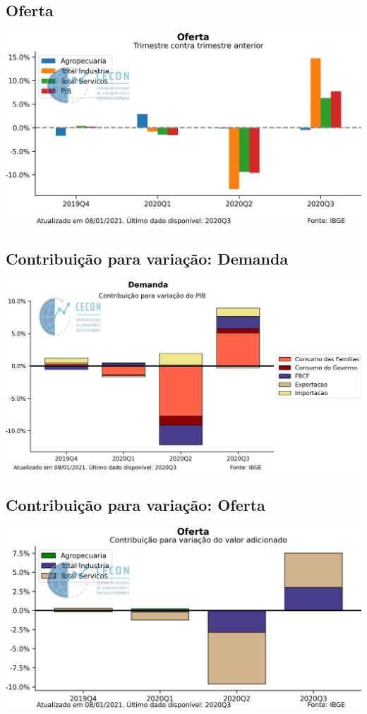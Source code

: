 \documentclass{SelfArx}
\begin{document}
\subsection*{Oferta}
\label{sec:org6429364}


\begin{center}
\includegraphics[width=.9\linewidth]{./figs/PIB/Oferta.png}
\end{center}


\subsection*{Contribuição para variação: Demanda}
\label{sec:orgec85e0a}

\begin{center}
\includegraphics[width=.9\linewidth]{./figs/PIB/Contrib_Demanda.png}
\end{center}

\subsection*{Contribuição para variação: Oferta}
\label{sec:org5c10287}

\begin{center}
\includegraphics[width=.9\linewidth]{./figs/PIB/Contrib_Oferta.png}
\end{center}
\end{document}
